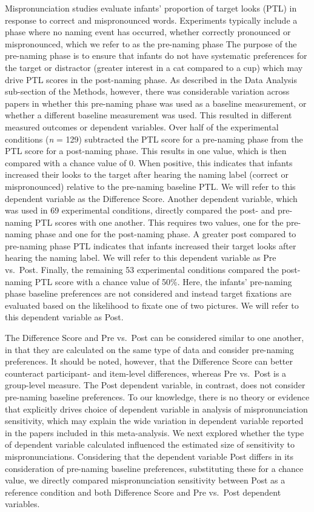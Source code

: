 \documentclass[man]{apa6}
\theoremstyle{definition}
\theoremstyle{definition}
\theoremstyle{definition}
\theoremstyle{remark}
\begin{document}
Mispronunciation studies evaluate infants' proportion of target looks
(PTL) in response to correct and mispronounced words. Experiments
typically include a phase where no naming event has occurred, whether
correctly pronounced or mispronounced, which we refer to as the
pre-naming phase The purpose of the pre-naming phase is to ensure that
infants do not have systematic preferences for the target or distractor
(greater interest in a cat compared to a cup) which may drive PTL scores
in the post-naming phase. As described in the Data Analysis sub-section
of the Methods, however, there was considerable variation across papers
in whether this pre-naming phase was used as a baseline measurement, or
whether a different baseline measurement was used. This resulted in
different measured outcomes or dependent variables. Over half of the
experimental conditions (\emph{n} = 129) subtracted the PTL score for a
pre-naming phase from the PTL score for a post-naming phase. This
results in one value, which is then compared with a chance value of 0.
When positive, this indicates that infants increased their looks to the
target after hearing the naming label (correct or mispronounced)
relative to the pre-naming baseline PTL. We will refer to this dependent
variable as the Difference Score. Another dependent variable, which was
used in 69 experimental conditions, directly compared the post- and
pre-naming PTL scores with one another. This requires two values, one
for the pre-naming phase and one for the post-naming phase. A greater
post compared to pre-naming phase PTL indicates that infants increased
their target looks after hearing the naming label. We will refer to this
dependent variable as Pre vs.~Post. Finally, the remaining 53
experimental conditions compared the post-naming PTL score with a chance
value of 50\%. Here, the infants' pre-naming phase baseline preferences
are not considered and instead target fixations are evaluated based on
the likelihood to fixate one of two pictures. We will refer to this
dependent variable as Post.

The Difference Score and Pre vs.~Post can be considered similar to one
another, in that they are calculated on the same type of data and
consider pre-naming preferences. It should be noted, however, that the
Difference Score can better counteract participant- and item-level
differences, whereas Pre vs.~Post is a group-level measure. The Post
dependent variable, in contrast, does not consider pre-naming baseline
preferences. To our knowledge, there is no theory or evidence that
explicitly drives choice of dependent variable in analysis of
mispronunciation sensitivity, which may explain the wide variation in
dependent variable reported in the papers included in this
meta-analysis. We next explored whether the type of dependent variable
calculated influenced the estimated size of sensitivity to
mispronunciations. Considering that the dependent variable Post differs
in its consideration of pre-naming baseline preferences, substituting
these for a chance value, we directly compared mispronunciation
sensitivity between Post as a reference condition and both Difference
Score and Pre vs.~Post dependent variables.
\end{document}
